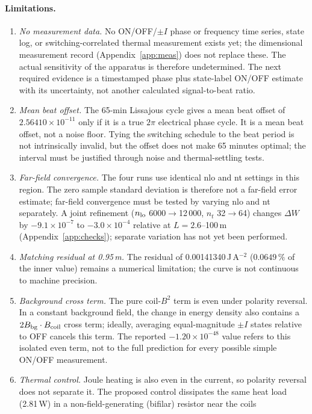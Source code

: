 \documentclass[12pt,a4paper]{article}
\begin{document}
\paragraph{Limitations.}
\begin{enumerate}
\item \emph{No measurement data.} No ON/OFF/$\pm I$ phase or frequency time series, state log, or
switching-correlated thermal measurement exists yet; the dimensional measurement record (Appendix~\ref{app:meas})
does not replace these. The actual sensitivity of the apparatus is therefore undetermined. The next required evidence
is a timestamped phase plus state-label ON/OFF estimate with its uncertainty, not another calculated signal-to-beat
ratio.
\item \emph{Mean beat offset.} The 65-min Lissajous cycle gives a mean beat offset of $2.56410\times10^{-11}$ only if it
is a true $2\pi$ electrical phase cycle. It is a mean beat offset, not a noise floor. Tying the switching schedule to
the beat period is not intrinsically invalid, but the offset does not make 65 minutes optimal; the interval must be
justified through noise and thermal-settling tests.
\item \emph{Far-field convergence.} The four runs use identical nlo and nt settings in this region. The zero sample
standard deviation is therefore not a far-field error estimate; far-field convergence must be tested by varying nlo
and nt separately. A joint refinement ($n_{\rm lo}$ 6000$\to$12\,000, $n_t$ 32$\to$64) changes $\Delta W$ by
$-9.1\times10^{-7}$ to $-3.0\times10^{-4}$ relative at $L=2.6$--100\,m (Appendix~\ref{app:checks}); separate
variation has not yet been performed.
\item \emph{Matching residual at 0.95\,m.} The residual of 0.00141340\,J\,A$^{-2}$ ($0.0649\,\%$ of the inner value)
remains a numerical limitation; the curve is not continuous to machine precision.
\item \emph{Background cross term.} The pure coil-$B^2$ term is even under polarity reversal. In a constant background
field, the change in energy density also contains a $2B_{\rm bg}\cdot B_{\rm coil}$ cross term; ideally, averaging
equal-magnitude $\pm I$ states relative to OFF cancels this term. The reported $-1.20\times10^{-48}$ value refers to this
isolated even term, not to the full prediction for every possible simple ON/OFF measurement.
\item \emph{Thermal control.} Joule heating is also even in the current, so polarity reversal does not separate it. The
proposed control dissipates the same heat load (2.81\,W) in a non-field-generating (bifilar) resistor near the coils

\end{enumerate}
\end{document}
